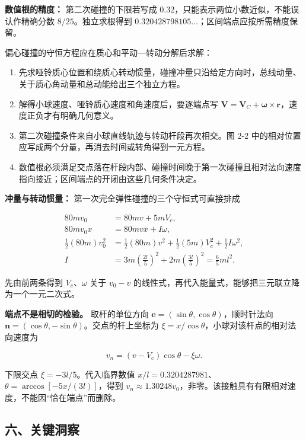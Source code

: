 \documentclass[12pt,a4paper,UTF8]{ctexart}
\newcommand{\tightlist}{\setlength{\itemsep}{0pt}\setlength{\parskip}{0pt}}
\begin{document}
\textbf{数值根的精度：} 第二次碰撞的下限若写成
\(0.32\)，只能表示两位小数近似，不能误认作精确分数
\(8/25\)。独立求根得到
\(0.320428798105\ldots\)；区间端点应按所需精度保留。

偏心碰撞的守恒方程应在质心和平动---转动分解后求解：

\begin{enumerate}
\def\labelenumi{\arabic{enumi}.}
\tightlist
\item
  先求哑铃质心位置和绕质心转动惯量，碰撞冲量只沿给定方向时，总线动量、关于质心角动量和总动能给出三个独立方程。
\item
  解得小球速度、哑铃质心速度和角速度后，要逐端点写
  \(\boldsymbol V=\boldsymbol V_C+\boldsymbol\omega\times\boldsymbol r\)，速度正负才有明确几何意义。
\item
  第二次碰撞条件来自小球直线轨迹与转动杆段再次相交。图 2-2
  中的相对位置应写成两个分量，再消去时间或转角得到一元方程。
\item
  数值根必须满足交点落在杆段内部、碰撞时间晚于第一次碰撞且相对法向速度指向接近；区间端点的开闭由这些几何条件决定。
\end{enumerate}

\textbf{冲量与转动惯量：} 第一次完全弹性碰撞的三个守恒式可直接排成

\[\begin{aligned}
80mv_0&=80mv+5mV_c,\\
80mv_0x&=80mvx+I\omega,\\
\frac12(80m)v_0^2&=\frac12(80m)v^2
+\frac12(5m)V_c^2+\frac12I\omega^2,\\
I&=3m\left(\frac{2l}{5}\right)^2
+2m\left(\frac{3l}{5}\right)^2
=\frac65ml^2.
\end{aligned}\]

先由前两条得到 \(V_c\)、\(\omega\) 关于 \(v_0-v\)
的线性式，再代入能量式，能够把三元联立降为一个一元二次式。

\textbf{端点不是相切的检验。} 取杆的单位方向
\(\boldsymbol e=(\sin\theta,\cos\theta)\)，顺时针法向
\(\boldsymbol n=(\cos\theta,-\sin\theta)\)。交点的杆上坐标为
\(\xi=x/\cos\theta\)，小球对该杆点的相对法向速度为

\[v_n=(v-V_c)\cos\theta-\xi\omega.\]

下限交点 \(\xi=-3l/5\)。代入临界数值
\(x/l=0.3204287981\)、\(\theta=\arccos[-5x/(3l)]\)，得到
\(v_n\approx1.30248v_0\)，非零。该接触具有有限相对速度，不能因``恰在端点''而删除。

\subsection{六、关键洞察}\label{ux516dux5173ux952eux6d1eux5bdf-1}
\end{document}
